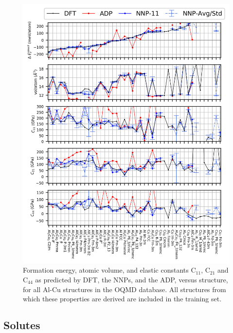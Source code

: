 \documentclass{article}
\begin{document}
\begin{figure}[H]%
\centering%
\includegraphics[width=1\textwidth,center]{figures/matparam_stats1.png}%
\caption{Formation energy, atomic volume, and elastic constants C$_{11}$, C$_{21}$ and C$_{44}$ as predicted by DFT, the NNPs, and the ADP, versus structure, for all Al-Cu structures in the OQMD database.  All structures from which these properties are derived are included in the training set.}
\label{fig:matparam_stats1}
\end{figure}

\subsection{Solutes} \label{sct:solute_results}
\end{document}
